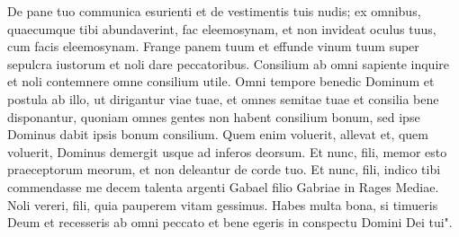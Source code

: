 \begin{biblechapter}
\verse De pane tuo communica esurienti et de vestimentis tuis nudis; ex omnibus, quaecumque tibi abundaverint, fac eleemosynam, et non invideat oculus tuus, cum facis eleemosynam. 
\verse Frange panem tuum et effunde vinum tuum super sepulcra iustorum et noli dare peccatoribus. 
\verse Consilium ab omni sapiente inquire et noli contemnere omne consilium utile. 
\verse Omni tempore benedic Dominum et postula ab illo, ut dirigantur viae tuae, et omnes semitae tuae et consilia bene disponantur, quoniam omnes gentes non habent consilium bonum, sed ipse Dominus dabit ipsis bonum consilium. Quem enim voluerit, allevat et, quem voluerit, Dominus demergit usque ad inferos deorsum. Et nunc, fili, memor esto praeceptorum meorum, et non deleantur de corde tuo. 
\verse Et nunc, fili, indico tibi commendasse me decem talenta argenti Gabael filio Gabriae in Rages Mediae. 
\verse Noli vereri, fili, quia pauperem vitam gessimus. Habes multa bona, si timueris Deum et recesseris ab omni peccato et bene egeris in conspectu Domini Dei tui". 
\end{biblechapter}


